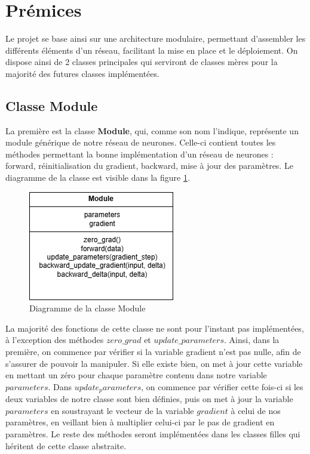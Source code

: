 \documentclass{article}
\begin{document}
\section{Prémices}

Le projet se base ainsi sur une architecture modulaire, permettant d'assembler les différents éléments d'un réseau, facilitant la mise en place et le déploiement. On dispose ainsi de 2 classes principales qui serviront de classes mères pour la majorité des futures classes implémentées.
\subsection{Classe Module}
La première est la classe \textbf{Module}, qui, comme son nom l'indique, représente un module générique de notre réseau de neurones. Celle-ci contient toutes les méthodes permettant la bonne implémentation d'un réseau de neurones : forward, réinitialisation du gradient, backward, mise à jour des paramètres. Le diagramme de la classe est visible dans la figure \ref{fig:module}.

\begin{figure}[H]
    \centering
    \includegraphics[width=0.4\linewidth]{Images/module.png}
    \caption{Diagramme de la classe Module}
    \label{fig:module}
\end{figure}

La majorité des fonctions de cette classe ne sont pour l'instant pas implémentées, à l'exception des méthodes $zero\_grad$ et $update\_parameters$. Ainsi, dans la première, on commence par vérifier si la variable gradient n'est pas nulle, afin de s'assurer de pouvoir la manipuler. Si elle existe bien, on met à jour cette variable en mettant un zéro pour chaque paramètre contenu dans notre variable $parameters$. 
Dans $update_parameters$, on commence par vérifier cette fois-ci si les deux variables de notre classe sont bien définies, puis on met à jour la variable $parameters$ en soustrayant le vecteur de la variable $gradient$ à celui de nos paramètres, en veillant bien à multiplier celui-ci par le pas de gradient en paramètres.
Le reste des méthodes seront implémentées dans les classes filles qui héritent de cette classe abstraite.
\end{document}
